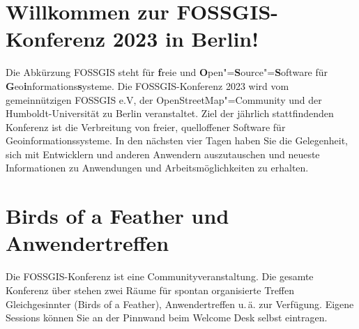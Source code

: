 \newpage
\section*{Willkommen zur FOSSGIS-Konferenz 2023 in Berlin!} \label{welcome}
Die Abkürzung { FOSSGIS} steht für {\bfseries f}reie und {\bfseries O}pen"={\bfseries S}ource"={\bfseries S}oftware für {\bfseries G}eo{\bfseries i}nformations{\bfseries s}ysteme.
Die FOSSGIS-Konferenz 2023 wird vom gemeinnützigen FOSSGIS e.V, der
OpenStreetMap"=Community und der Humboldt-Universität zu Berlin
veranstaltet.
Ziel der jährlich stattfindenden Konferenz ist die Verbreitung von freier,
quelloffener Software für Geoinformationssysteme. In den nächsten vier Tagen
haben Sie die Gelegenheit, sich mit Entwicklern und anderen Anwendern
auszutauschen und \mbox{neueste} Informationen zu Anwendungen und
Arbeitsmöglichkeiten zu erhalten.

\section*{Birds of a Feather und Anwendertreffen}
Die FOSSGIS-Konferenz ist eine Communityveranstaltung.
Die gesamte Konferenz über stehen zwei Räume für spontan organisierte
Treffen Gleichgesinnter (Birds of a Feather), Anwendertreffen u.\,ä.
zur Verfügung. Eigene Sessions können Sie an der Pinnwand beim
Welcome Desk selbst eintragen.

\newpage

\newpage

\newpage

\newpage

\newpage

\newpage

